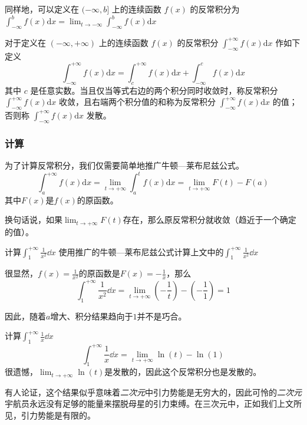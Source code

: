 同样地，可以定义在 $(-\infty,b]$ 上的连续函数 $f(x)$ 的反常积分为 $\displaystyle \int ^b _{-\infty}f(x)\mathrm{d} x=\lim_{t\rightarrow-\infty }\int ^b _{-\infty}f(x)\mathrm{d} x$

对于定义在 $(-\infty,+\infty )$ 上的连续函数 $f(x)$ 的反常积分 $\displaystyle \int ^{+\infty}_{-\infty}f(x)\mathrm{d} x$ 作如下定义
$$\displaystyle \int ^{+\infty}_{-\infty}f(x)\mathrm{d} x=\displaystyle \int ^{+\infty}_c f(x)\mathrm{d} x+\displaystyle \int ^c _{-\infty}f(x)\mathrm{d} x$$
其中 $c$ 是任意实数。当且仅当等式右边的两个积分同时收敛时，称反常积分 $\displaystyle \int ^{+\infty}_{-\infty}f(x)\mathrm{d} x$ 收敛，且右端两个积分值的和称为反常积分 $\displaystyle \int ^{+\infty}_{-\infty}f(x)\mathrm{d} x$ 的值；否则称 $\displaystyle \int ^{+\infty}_{-\infty}f(x)\mathrm{d} x$ 发散。

\subsubsection{计算}
为了计算反常积分，我们仅需要简单地推广牛顿—莱布尼兹公式。
\begin{equation}
\displaystyle \int ^{+\infty}_a f(x)\mathrm{d} x=\lim_{t\rightarrow+\infty }\int _a^{t}f(x)\mathrm{d} x
=\lim_{t\rightarrow+\infty }F(t) - F(a)
\end{equation}
其中$F(x)$是$f(x)$的原函数。

换句话说，如果$\lim_{t\rightarrow+\infty } F(t)$存在，那么原反常积分就收敛（趋近于一个确定的值）。

\begin{example}{计算$\int^{+\infty}_1 \frac{1}{x^2} \dd x$}
使用推广的牛顿—莱布尼兹公式计算上文中的$\int^{+\infty}_1 \frac{1}{x^2} \dd x$

很显然，$f(x)=\frac{1}{x^2}$的原函数是$F(x)=-\frac{1}{x}$，那么
$$\int^{+\infty}_1 \frac{1}{x^2} \dd x=\lim_{t\rightarrow+\infty } (-\frac{1}{t}) - (-\frac{1}{1})=1$$

因此，随着$a$增大、积分结果趋向于$1$并不是巧合。
\end{example}

\begin{example}{计算$\int^{+\infty}_1 \frac{1}{x} \dd x$}
$$\int^{+\infty}_1 \frac{1}{x} \dd x=\lim_{t\rightarrow+\infty } {\ln(t)} - \ln(1)$$
很遗憾，$\lim_{t\rightarrow+\infty } {\ln(t)} $是发散的，因此这个反常积分也是发散的。

有人论证，这个结果似乎意味着\textsl{二次元}中引力势能是无穷大的，因此可怜的\textsl{二次元}宇航员永远没有足够的能量来摆脱母星的引力束缚。在三次元中，正如我们上文所见，引力势能是有限的。

\end{example}

